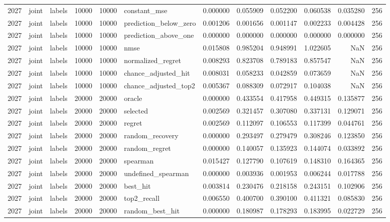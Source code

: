 \begin{tabular}{rllrrlrrrrrr}
2027 & joint & labels & 10000 & 10000 & constant_mse & 0.000000 & 0.055909 & 0.052200 & 0.060538 & 0.035280 & 256 \\
2027 & joint & labels & 10000 & 10000 & prediction_below_zero & 0.001206 & 0.001656 & 0.001147 & 0.002233 & 0.004428 & 256 \\
2027 & joint & labels & 10000 & 10000 & prediction_above_one & 0.000000 & 0.000000 & 0.000000 & 0.000000 & 0.000000 & 256 \\
2027 & joint & labels & 10000 & 10000 & nmse & 0.015808 & 0.985204 & 0.948991 & 1.022605 & NaN & 256 \\
2027 & joint & labels & 10000 & 10000 & normalized_regret & 0.008293 & 0.823708 & 0.789183 & 0.857547 & NaN & 256 \\
2027 & joint & labels & 10000 & 10000 & chance_adjusted_hit & 0.008031 & 0.058233 & 0.042859 & 0.073659 & NaN & 256 \\
2027 & joint & labels & 10000 & 10000 & chance_adjusted_top2 & 0.005367 & 0.088309 & 0.072917 & 0.104038 & NaN & 256 \\
2027 & joint & labels & 20000 & 20000 & oracle & 0.000000 & 0.433554 & 0.417958 & 0.449315 & 0.135877 & 256 \\
2027 & joint & labels & 20000 & 20000 & selected & 0.002569 & 0.321457 & 0.307080 & 0.337131 & 0.129071 & 256 \\
2027 & joint & labels & 20000 & 20000 & regret & 0.002569 & 0.112097 & 0.106553 & 0.117399 & 0.044761 & 256 \\
2027 & joint & labels & 20000 & 20000 & random_recovery & 0.000000 & 0.293497 & 0.279479 & 0.308246 & 0.123850 & 256 \\
2027 & joint & labels & 20000 & 20000 & random_regret & 0.000000 & 0.140057 & 0.135923 & 0.144074 & 0.033892 & 256 \\
2027 & joint & labels & 20000 & 20000 & spearman & 0.015427 & 0.127790 & 0.107619 & 0.148310 & 0.164365 & 256 \\
2027 & joint & labels & 20000 & 20000 & undefined_spearman & 0.000000 & 0.003936 & 0.001953 & 0.006244 & 0.017788 & 256 \\
2027 & joint & labels & 20000 & 20000 & best_hit & 0.003814 & 0.230476 & 0.218158 & 0.243151 & 0.102906 & 256 \\
2027 & joint & labels & 20000 & 20000 & top2_recall & 0.006550 & 0.400700 & 0.390100 & 0.411321 & 0.085830 & 256 \\
2027 & joint & labels & 20000 & 20000 & random_best_hit & 0.000000 & 0.180987 & 0.178293 & 0.183995 & 0.022729 & 256 \\

\end{tabular}
